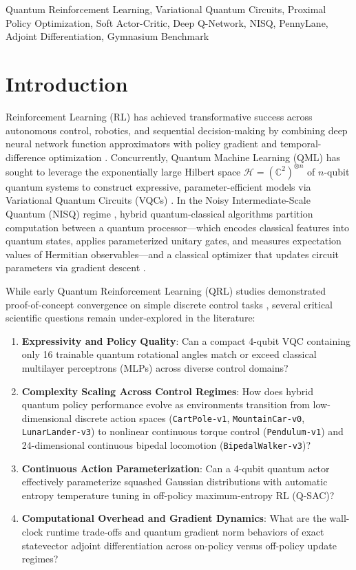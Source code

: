 \documentclass[conference]{IEEEtran}
\begin{document}
\begin{IEEEkeywords}
Quantum Reinforcement Learning, Variational Quantum Circuits, Proximal Policy Optimization, Soft Actor-Critic, Deep Q-Network, NISQ, PennyLane, Adjoint Differentiation, Gymnasium Benchmark
\end{IEEEkeywords}

\section{Introduction}
Reinforcement Learning (RL) has achieved transformative success across autonomous control, robotics, and sequential decision-making by combining deep neural network function approximators with policy gradient and temporal-difference optimization \cite{sutton2018reinforcement, mnih2015human, schulman2017proximal, haarnoja2018soft}. Concurrently, Quantum Machine Learning (QML) has sought to leverage the exponentially large Hilbert space $\mathcal{H} = (\mathbb{C}^2)^{\otimes n}$ of $n$-qubit quantum systems to construct expressive, parameter-efficient models via Variational Quantum Circuits (VQCs) \cite{biamonte2017quantum, cerezo2021variational, benedetti2019parameterized}. In the Noisy Intermediate-Scale Quantum (NISQ) regime \cite{preskill2018quantum}, hybrid quantum-classical algorithms partition computation between a quantum processor---which encodes classical features into quantum states, applies parameterized unitary gates, and measures expectation values of Hermitian observables---and a classical optimizer that updates circuit parameters via gradient descent \cite{bergholm2018pennylane, jones2020efficient}.

While early Quantum Reinforcement Learning (QRL) studies demonstrated proof-of-concept convergence on simple discrete control tasks \cite{chen2020variational, jerbi2021parametrized, skolik2022quantum}, several critical scientific questions remain under-explored in the literature:
\begin{enumerate}
    \item \textbf{Expressivity and Policy Quality}: Can a compact 4-qubit VQC containing only 16 trainable quantum rotational angles match or exceed classical multilayer perceptrons (MLPs) across diverse control domains?
    \item \textbf{Complexity Scaling Across Control Regimes}: How does hybrid quantum policy performance evolve as environments transition from low-dimensional discrete action spaces (\texttt{CartPole-v1}, \texttt{MountainCar-v0}, \texttt{LunarLander-v3}) to nonlinear continuous torque control (\texttt{Pendulum-v1}) and 24-dimensional continuous bipedal locomotion (\texttt{BipedalWalker-v3})?
    \item \textbf{Continuous Action Parameterization}: Can a 4-qubit quantum actor effectively parameterize squashed Gaussian distributions with automatic entropy temperature tuning in off-policy maximum-entropy RL (Q-SAC)?
    \item \textbf{Computational Overhead and Gradient Dynamics}: What are the wall-clock runtime trade-offs and quantum gradient norm behaviors of exact statevector adjoint differentiation across on-policy versus off-policy update regimes?
\end{enumerate}
\end{document}
